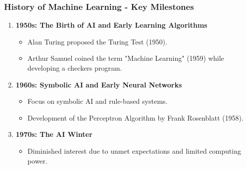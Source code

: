 \documentclass{beamer}
\begin{document}
\begin{frame}[fragile]
    \frametitle{History of Machine Learning - Key Milestones}
    \begin{enumerate}
        \item \textbf{1950s: The Birth of AI and Early Learning Algorithms}
            \begin{itemize}
                \item Alan Turing proposed the Turing Test (1950).
                \item Arthur Samuel coined the term "Machine Learning" (1959) while developing a checkers program.
            \end{itemize}
        \item \textbf{1960s: Symbolic AI and Early Neural Networks}
            \begin{itemize}
                \item Focus on symbolic AI and rule-based systems.
                \item Development of the Perceptron Algorithm by Frank Rosenblatt (1958).
            \end{itemize}
        \item \textbf{1970s: The AI Winter}
            \begin{itemize}
                \item Diminished interest due to unmet expectations and limited computing power.
            \end{itemize}
    \end{enumerate}
\end{frame}
\end{document}
